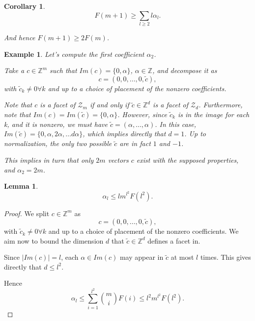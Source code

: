 \documentclass[12pt]{report}
\newtheorem*{lemma}{Lemma}
\newtheorem*{corollary}{Corollary}
\newtheorem*{example}{Example}
\newcommand{\Z}{\mathbb{Z}}
\newcommand{\mZ}{\mathcal{Z}}
\begin{document}
\begin{corollary}
\[
F(m+1) \geq \sum_{l \geq 2} l \alpha_l.
\]

And hence $F(m+1) \geq 2 F(m)$.
\end{corollary}

\begin{example}
Let's compute the first coefficient $\alpha_2$. 

Take a $c \in \Z^m$ such that $Im(c) = \{ 0, \alpha \}$, $\alpha \in \Z$, and decompose it as
\[
c = (0, 0, \dots, 0, \tilde{c}),
\]
with $\tilde{c}_k \neq 0 \forall k$ and up to a choice of placement of the nonzero coefficients.

Note that $c$ is a facet of $\mZ_m$ if and only if $\tilde{c} \in \Z^d$ is a facet of $\mZ_{d}$. Furthermore, note that $Im(c) = Im(\tilde{c}) = \{0, \alpha\}$. However, since $\tilde{c}_k$ is in the image for each k, and it is nonzero, we must have $\tilde{c} = (\alpha, \dots, \alpha)$. In this case, $Im(\tilde{c}) = \{0, \alpha, 2\alpha, \dots d \alpha\}$, which implies directly that $d=1$. Up to normalization, the only two possible $\tilde{c}$ are in fact $1$ and $-1$.

This implies in turn that only $2m$ vectors $c$ exist with the supposed properties, and $\alpha_2 = 2m$.
\end{example}

\begin{lemma}
\[
\alpha_l \leq l m^{l^2} F(l^2).
\]
\end{lemma}
\begin{proof}
We split $c \in \Z^m$ as
\[
c = (0, 0, \dots, 0, \tilde{c}),
\]
with $\tilde{c}_k \neq 0 \forall k$ and up to a choice of placement of the nonzero coefficients. We aim now to bound the dimension $d$ that $\tilde{c} \in \Z^d$ defines a facet in.

Since $|Im(c)| = l$, each $\alpha \in Im(c)$ may appear in $\tilde{c}$ at most $l$ times. This gives directly that $d \leq l^2$.

Hence 
\[
\alpha_l \leq \sum_{i=1}^{l^2} {m \choose i} F(i) \leq l^2 m^{l^2} F(l^2).
\]
\end{proof}
\end{document}
